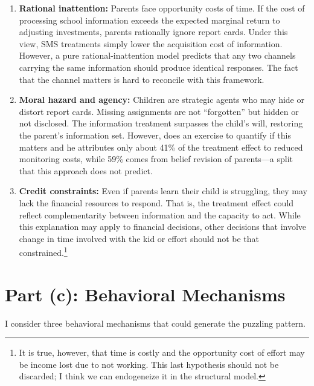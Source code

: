 \documentclass[11pt]{article}
\begin{document}
\begin{enumerate}
    \item \textbf{Rational inattention:} Parents face opportunity costs of time. If the cost of processing school information exceeds the expected marginal return to adjusting investments, parents rationally ignore report cards. Under this view, SMS treatments simply lower the acquisition cost of information. However, a pure rational-inattention model predicts that any two channels carrying the same information should produce identical responses. The fact that the channel matters is hard to reconcile with this framework.

    \item \textbf{Moral hazard and agency:} Children are strategic agents who may hide or distort report cards. Missing assignments are not ``forgotten'' but hidden or not disclosed. The information treatment surpasses the child's will, restoring the parent's information set. However, \citet{bergman2021information} does an exercise to quantify if this matters and he attributes only about 41\% of the treatment effect to reduced monitoring costs, while 59\% comes from belief revision of parents---a split that this approach does not predict.

    \item \textbf{Credit constraints:} Even if parents learn their child is struggling, they may lack the financial resources to respond. That is, the treatment effect could reflect complementarity between information and the capacity to act. While this explanation may apply to financial decisions, other decisions that involve change in time involved with the kid or effort should not be that constrained.\footnote{It is true, however, that time is costly and the opportunity cost of effort may be income lost due to not working. This last hypothesis should not be discarded; I think we can endogeneize it in the structural model.}
\end{enumerate}

\section{Part (c): Behavioral Mechanisms}

I consider three behavioral mechanisms that could generate the puzzling pattern.
\end{document}

